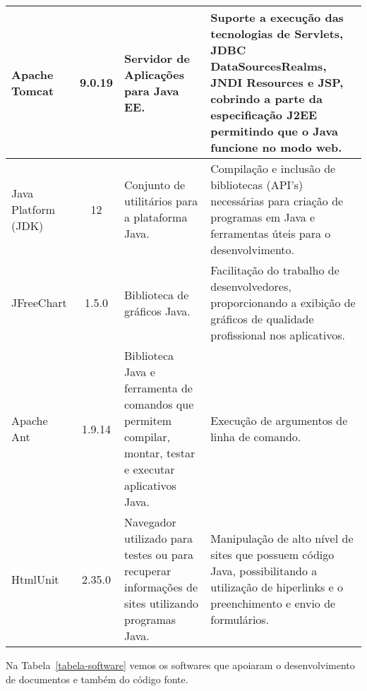 \begin{table}[h]
\begin{tabular}{|p{1.6cm}|c|p{5cm}|p{6.5cm}|}
		Apache Tomcat & 9.0.19 & Servidor de Aplicações para Java EE. & Suporte a execução das tecnologias de Servlets, JDBC DataSourcesRealms, JNDI Resources e JSP, cobrindo a parte da especificação J2EE permitindo que o Java funcione no modo web. \\\hline
		
		Java Platform (JDK) & 12 & Conjunto de utilitários para a plataforma Java. & Compilação e inclusão de bibliotecas (API’s) necessárias para criação de programas em Java e ferramentas úteis para o desenvolvimento. \\\hline
		
		JFreeChart & 1.5.0 & Biblioteca de gráficos Java. & Facilitação do trabalho de desenvolvedores, proporcionando a exibição de gráficos de qualidade profissional nos aplicativos. \\\hline		
		
		Apache Ant & 1.9.14 & Biblioteca Java e ferramenta de comandos que permitem compilar, montar, testar e executar aplicativos Java. & Execução de argumentos de linha de comando. \\\hline
		
	HtmlUnit & 2.35.0 & Navegador utilizado para testes ou para recuperar informações de sites utilizando programas Java. & Manipulação de alto nível de sites que possuem código Java, possibilitando a utilização de hiperlinks e o preenchimento e envio de formulários. \\\hline		
		
	\end{tabular}
\end{table}







\newpage
Na Tabela~\ref{tabela-software} vemos os softwares que apoiaram o desenvolvimento de documentos e também do código fonte.


